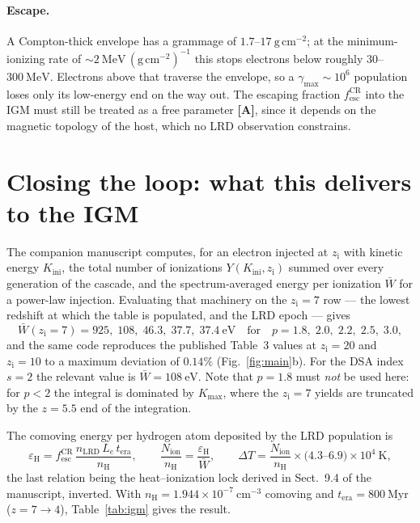 \documentclass[11pt,a4paper]{article}
\newcommand{\Kini}{K_{\mathrm{ini}}}
\newcommand{\zi}{z_{\mathrm{i}}}
\newcommand{\cmt}{\ \mathrm{cm^{-3}}}
\begin{document}
\paragraph{Escape.} A Compton-thick envelope has a grammage of
$1.7$--$17\ \mathrm{g\,cm^{-2}}$; at the minimum-ionizing rate of
$\sim\!2\ \mathrm{MeV\,(g\,cm^{-2})^{-1}}$ this stops electrons below roughly
$30$--$300\ \mathrm{MeV}$. Electrons above that traverse the envelope, so a
$\gamma_{\max}\sim10^{6}$ population loses only its low-energy end on the way
out. The escaping fraction $f_{\mathrm{esc}}^{\mathrm{CR}}$ into the IGM must
still be treated as a free parameter \textbf{[A]}, since it depends on the
magnetic topology of the host, which no LRD observation constrains.

\section{Closing the loop: what this delivers to the IGM}
\label{sec:igm}
The companion manuscript computes, for an electron injected at $\zi$ with
kinetic energy $\Kini$, the total number of ionizations $Y(\Kini,\zi)$ summed
over every generation of the cascade, and the spectrum-averaged energy per
ionization $\bar W$ for a power-law injection. Evaluating that machinery on the
$\zi=7$ row --- the lowest redshift at which the table is populated, and the
LRD epoch --- gives
\begin{equation}
  \bar W(\zi=7) = 925,\;108,\;46.3,\;37.7,\;37.4\ \mathrm{eV}
  \quad\text{for}\quad p=1.8,\;2.0,\;2.2,\;2.5,\;3.0 ,
\end{equation}
and the same code reproduces the published Table~3 values at $\zi=20$ and
$\zi=10$ to a maximum deviation of $0.14\%$ (Fig.~\ref{fig:main}b). For the
DSA index $s=2$ the relevant value is $\bar W=108\ \mathrm{eV}$. Note that
$p=1.8$ must \emph{not} be used here: for $p<2$ the integral is dominated by
$K_{\max}$, where the $\zi=7$ yields are truncated by the $z=5.5$ end of the
integration.

The comoving energy per hydrogen atom deposited by the LRD population is
\begin{equation}
  \varepsilon_{\mathrm H}
  = f_{\mathrm{esc}}^{\mathrm{CR}}\,
    \frac{n_{\mathrm{LRD}}\,L_e\,t_{\mathrm{era}}}{n_{\mathrm H}},
  \qquad
  \frac{N_{\mathrm{ion}}}{n_{\mathrm H}}=\frac{\varepsilon_{\mathrm H}}{\bar W},
  \qquad
  \Delta T = \frac{N_{\mathrm{ion}}}{n_{\mathrm H}}\times
             \bigl(4.3\text{--}6.9\bigr)\times10^{4}\ \mathrm{K},
  \label{eq:igm}
\end{equation}
the last relation being the heat--ionization lock derived in Sect.~9.4 of the
manuscript, inverted. With $n_{\mathrm H}=1.944\times10^{-7}\cmt$ comoving and
$t_{\mathrm{era}}=800\ \mathrm{Myr}$ ($z=7\to4$), Table~\ref{tab:igm} gives the
result.
\end{document}
